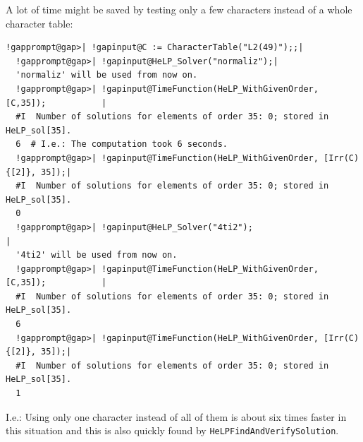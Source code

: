 \documentclass[a4paper,11pt]{report}
\begin{document}
{{ A lot of time might be saved by testing only a few characters instead of a
whole character table: 
\begin{Verbatim}[commandchars=!@|,fontsize=\small,frame=single,label=Example]
  !gapprompt@gap>| !gapinput@C := CharacterTable("L2(49)");;|
  !gapprompt@gap>| !gapinput@HeLP_Solver("normaliz");|
  'normaliz' will be used from now on.
  !gapprompt@gap>| !gapinput@TimeFunction(HeLP_WithGivenOrder, [C,35]);           |
  #I  Number of solutions for elements of order 35: 0; stored in HeLP_sol[35].
  6  # I.e.: The computation took 6 seconds.
  !gapprompt@gap>| !gapinput@TimeFunction(HeLP_WithGivenOrder, [Irr(C){[2]}, 35]);|
  #I  Number of solutions for elements of order 35: 0; stored in HeLP_sol[35].
  0
  !gapprompt@gap>| !gapinput@HeLP_Solver("4ti2");                                 |
  '4ti2' will be used from now on.
  !gapprompt@gap>| !gapinput@TimeFunction(HeLP_WithGivenOrder, [C,35]);           |
  #I  Number of solutions for elements of order 35: 0; stored in HeLP_sol[35].
  6
  !gapprompt@gap>| !gapinput@TimeFunction(HeLP_WithGivenOrder, [Irr(C){[2]}, 35]);|
  #I  Number of solutions for elements of order 35: 0; stored in HeLP_sol[35].
  1
\end{Verbatim}
 

 I.e.: Using only one character instead of all of them is about six times
faster in this situation and this is also quickly found by \texttt{HeLP{\textunderscore}FindAndVerifySolution}. 

}}
\end{document}
